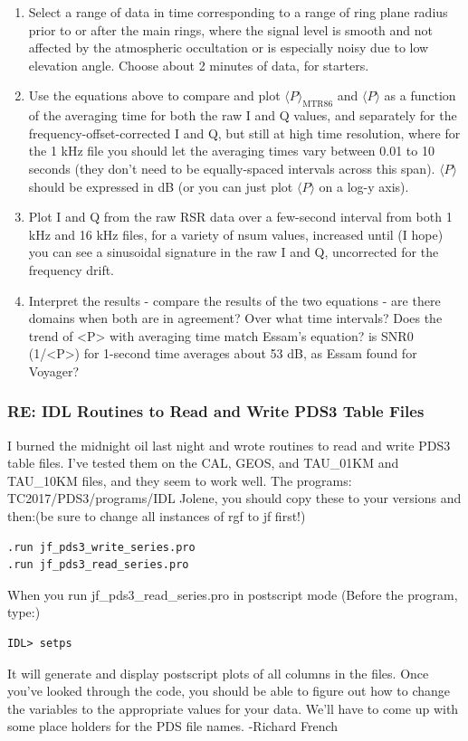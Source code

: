 \documentclass[crop=false,class=article,oneside]{standalone}
\begin{document}
\begin{enumerate}
    \item Select a range of data in time corresponding to a range of ring plane radius prior to or after the main rings, where the signal level is smooth and not affected by the atmospheric occultation or is especially noisy due to low elevation angle. Choose about 2 minutes of data, for starters.
    \item Use the equations above to compare and plot $\langle P\rangle_{\textrm{MTR86}}$ and $\langle P \rangle$ as a function of the averaging time for both the raw I and Q values, and separately for the frequency-offset-corrected I and Q, but still at high time resolution, where for the 1 kHz file you should let the averaging times vary between 0.01 to 10 seconds (they don't need to be equally-spaced intervals across this span). $\langle P \rangle$ should be expressed in dB (or you can just plot $\langle P \rangle$ on a log-y axis).
    \item Plot I and Q from the raw RSR data over a few-second interval from both 1 kHz and 16 kHz files, for a variety of nsum values, increased until (I hope) you can see a sinusoidal signature in the raw I and Q, uncorrected for the frequency drift.
    \item Interpret the results - compare the results of the two equations - are there domains when both are in agreement? Over what time intervals? Does the trend of <P> with averaging time match Essam's equation? is SNR0 (1/<P>) for 1-second time averages about 53 dB, as Essam found for Voyager?
\end{enumerate}
\subsubsection{\footnotesize RE: IDL Routines to Read and Write PDS3 Table Files}
I burned the midnight oil last night and wrote routines to read and write PDS3 table files. I've tested them on the CAL, GEOS, and TAU\_01KM and TAU\_10KM files, and they seem to work well. The programs: TC2017/PDS3/programs/IDL
Jolene, you should copy these to your versions and then:(be sure to change all instances of rgf to jf first!)
\begin{lstlisting}[language=IDL]
.run jf_pds3_write_series.pro
.run jf_pds3_read_series.pro
\end{lstlisting}
When you run jf\_pds3\_read\_series.pro in postscript mode (Before the program, type:)
\begin{lstlisting}[language=IDL]
IDL> setps
\end{lstlisting}
It will generate and display postscript plots of all columns in the files. Once you've looked through the code, you should be able to figure out how to change the variables to the appropriate values for your data. We'll have to come up with some place holders for the PDS file names. -Richard French
\end{document}
